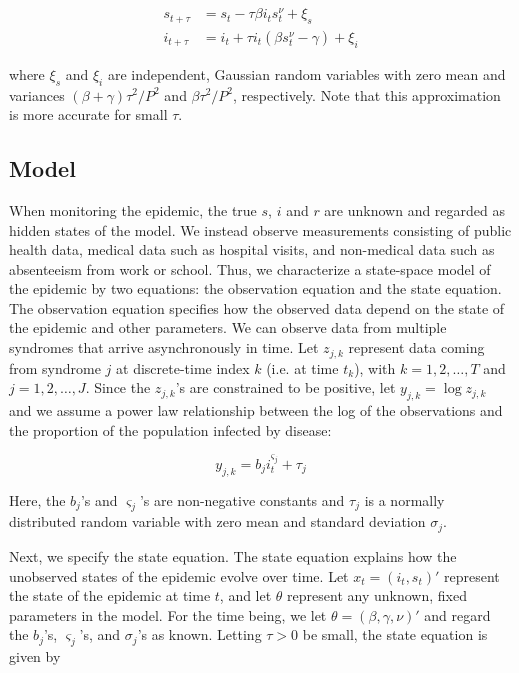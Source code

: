 \documentclass{article}
\begin{document}
\begin{align}
s_{t+\tau} &= s_t - \tau\beta i_ts^\nu_t + \xi_s \label{eqn:s} \\
i_{t+\tau} &= i_t + \tau i_t(\beta s^\nu_t - \gamma) + \xi_i \label{eqn:i}
\end{align}

\noindent where $\xi_s$ and $\xi_i$ are independent, Gaussian random variables with zero mean and variances $(\beta + \gamma)\tau^2/P^2$ and $\beta\tau^2/P^2$, respectively.  Note that this approximation is more accurate for small $\tau$.

\subsection{Model}

When monitoring the epidemic, the true $s$, $i$ and $r$ are unknown and regarded as hidden states of the model.  We instead observe measurements consisting of public health data, medical data such as hospital visits, and non-medical data such as absenteeism from work or school.  Thus, we characterize a state-space model of the epidemic by two equations: the observation equation and the state equation.  The observation equation specifies how the observed data depend on the state of the epidemic and other parameters.  We can observe data from multiple syndromes that arrive asynchronously in time.  Let $z_{j,k}$ represent data coming from syndrome $j$ at discrete-time index $k$ (i.e. at time $t_k$), with $k = 1,2,\ldots,T$ and $j = 1,2,\ldots,J$.  Since the $z_{j,k}$'s are constrained to be positive, let $y_{j,k} = \log z_{j,k}$ and we assume a power law relationship between the log of the observations and the proportion of the population infected by disease:

\begin{equation}
y_{j,k} = b_ji^{\varsigma_j}_t + \tau_j \label{eqn:obs}
\end{equation}

\noindent Here, the $b_j$'s and $\varsigma_j$'s are non-negative constants and $\tau_j$ is a normally distributed random variable with zero mean and standard deviation $\sigma_j$.

Next, we specify the state equation.  The state equation explains how the unobserved states of the epidemic evolve over time.  Let $x_t = (i_t,s_t)'$ represent the state of the epidemic at time $t$, and let $\theta$ represent any unknown, fixed parameters in the model.  For the time being, we let $\theta = (\beta, \gamma, \nu)'$ and regard the $b_j$'s, $\varsigma_j$'s, and $\sigma_j$'s as known.  Letting $\tau > 0$ be small, the state equation is given by
\end{document}
